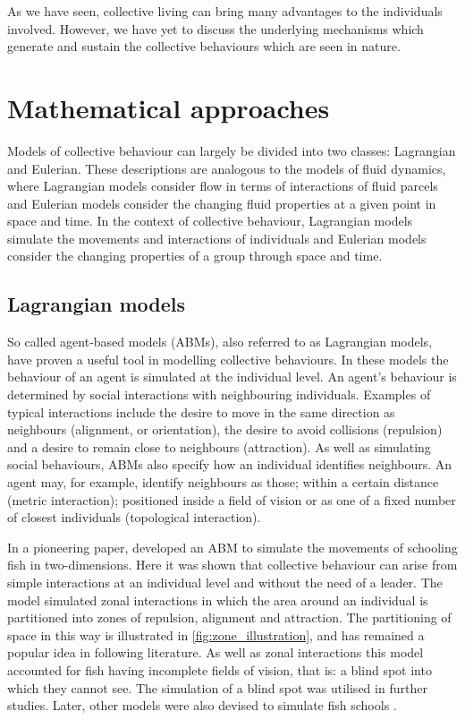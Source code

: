 As we have seen, collective living can bring many advantages to the individuals involved. However, we have yet to discuss the underlying mechanisms which generate and sustain the collective behaviours which are seen in nature.

\section{Mathematical approaches}
\label{sec:models}

Models of collective behaviour can largely be divided into two classes: Lagrangian and Eulerian. These descriptions are analogous to the models of fluid dynamics, where Lagrangian models consider flow in terms of interactions of fluid parcels and Eulerian models consider the changing fluid properties at a given point in space and time. In the context of collective behaviour, Lagrangian models simulate the movements and interactions of individuals and Eulerian models consider the changing properties of a group through space and time.

\subsection{Lagrangian models}
\label{ssec:lagrangian_models}

So called agent-based models (ABMs), also referred to as Lagrangian models, have proven a useful tool in modelling collective behaviours. In these models the behaviour of an agent is simulated at the individual level. An agent's behaviour is determined by social interactions with neighbouring individuals. Examples of typical interactions include the desire to move in the same direction as neighbours (alignment, or orientation), the desire to avoid collisions (repulsion) and a desire to remain close to neighbours (attraction). As well as simulating social behaviours, ABMs also specify how an individual identifies neighbours. An agent may, for example, identify neighbours as those; within a certain distance (metric interaction); positioned inside a field of vision or as one of a fixed number of closest individuals (topological interaction).

In a pioneering paper, \citet{aoki82} developed an ABM to simulate the movements of schooling fish in two-dimensions. Here it was shown that collective behaviour can arise from simple interactions at an individual level and without the need of a leader. The model simulated zonal interactions in which the area around an individual is partitioned into zones of repulsion, alignment and attraction. The partitioning of space in this way is illustrated in \cref{fig:zone_illustration}, and has remained a popular idea in following literature. As well as zonal interactions this model accounted for fish having incomplete fields of vision, that is: a blind spot into which they cannot see. The simulation of a blind spot was utilised in further studies. Later, other models were also devised to simulate fish schools \citep{okubo86, huth92}.

